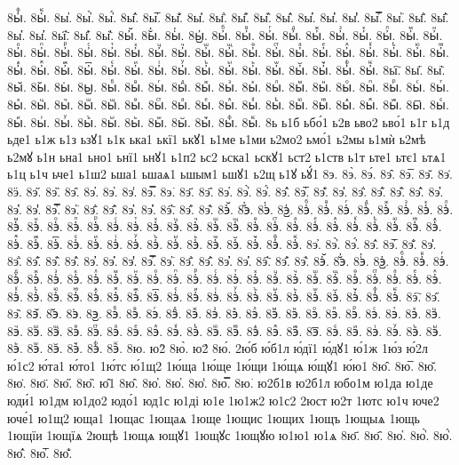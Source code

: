 {8ы҅ꚞ.
8ы҅ꚟ.
8ы҆.
8ы҆̀.
8ы҆́.
8ы҆̂.
8ы҆̅.
8ы҆̆.
8ы҆̇.
8ы҆̈.
8ы҆̋.
8ы҆̏.
8ы҆̑.
8ы҆̓.
8ы҆̔.
8ы҆̾.
8ы҆̿.
8ы҆͘.
8ы҆҃.
8ы҆҄.
8ы҆҅.
8ы҆҆.
8ы҆҇.
8ы҆᷀.
8ы҆᷁.
8ы҆᷶.
8ы᷷҆.
8ы᷸҆.
8ы᷹҆.
8ы҆ⷠ.
8ы҆ⷡ.
8ы҆ⷢ.
8ы҆ⷣ.
8ы҆ⷤ.
8ы҆ⷥ.
8ы҆ⷦ.
8ы҆ⷧ.
8ы҆ⷨ.
8ы҆ⷩ.
8ы҆ⷪ.
8ы҆ⷫ.
8ы҆ⷬ.
8ы҆ⷭ.
8ы҆ⷮ.
8ы҆ⷯ.
8ы҆ⷰ.
8ы҆ⷱ.
8ы҆ⷲ.
8ы҆ⷳ.
8ы҆ⷴ.
8ы҆ⷵ.
8ы҆ⷶ.
8ы҆ⷷ.
8ы҆ⷸ.
8ы҆ⷹ.
8ы҆ⷺ.
8ы҆ⷻ.
8ы҆ⷼ.
8ы҆ⷽ.
8ы҆ⷾ.
8ы҆ⷿ.
8ы҆꙯.
8ы҆ꙴ.
8ы҆ꙵ.
8ы҆ꙶ.
8ы҆ꙷ.
8ы҆ꙸ.
8ы҆ꙹ.
8ы҆ꙺ.
8ы҆ꙻ.
8ы҆꙼.
8ы҆꙽.
8ы҆ꚞ.
8ы҆ꚟ.
8ы҇.
8ы᷀.
8ы᷁.
8ы᷶.
8ы᷷.
8ы᷸.
8ы᷹.
8ыⷠ.
8ыⷡ.
8ыⷢ.
8ыⷣ.
8ыⷤ.
8ыⷥ.
8ыⷦ.
8ыⷧ.
8ыⷨ.
8ыⷩ.
8ыⷪ.
8ыⷫ.
8ыⷬ.
8ыⷭ.
8ыⷮ.
8ыⷯ.
8ыⷰ.
8ыⷱ.
8ыⷲ.
8ыⷳ.
8ыⷴ.
8ыⷵ.
8ыⷶ.
8ыⷷ.
8ыⷸ.
8ыⷹ.
8ыⷺ.
8ыⷻ.
8ыⷼ.
8ыⷽ.
8ыⷾ.
8ыⷿ.
8ы꙯.
8ыꙴ.
8ыꙵ.
8ыꙶ.
8ыꙷ.
8ыꙸ.
8ыꙹ.
8ыꙺ.
8ыꙻ.
8ы꙼.
8ы꙽.
8ыꚞ.
8ыꚟ.
8ь
ь1б
ьбо́1
ь2в
ьво2
ьво́1
ь1г
ь1д
ьде1
ь1ж
ь1з
ьзꙋ1
ь1к
ька1
ькї1
ькꙋ1
ь1ме
ь1ми
ь2мо2
ьмо́1
ь2мы
ь1мѝ
ь2мѣ
ь2мꙋ
ь1н
ьна1
ьно1
ьнї1
ьнꙋ1
ь1п2
ьс2
ьска1
ьскꙋ1
ьст2
ь1ств
ь1т
ьте1
ьтє1
ьтѧ1
ь1ц
ь1ч
ьче1
ь1ш2
ьша1
ьшаѧ1
ьшым1
ьшꙋ1
ь2щ
ь1ꙋ
ьꙋ́1
8э.
8э̀.
8э́.
8э̂.
8э̅.
8э̆.
8э̇.
8ӭ.
8э̋.
8э̏.
8э̑.
8э̓.
8э̔.
8э̾.
8э̿.
8э͘.
8э҃.
8э҄.
8э҅.
8э҅̀.
8э҅́.
8э҅̂.
8э҅̅.
8э҅̆.
8э҅̇.
8э҅̈.
8э҅̋.
8э҅̏.
8э҅̑.
8э҅̓.
8э҅̔.
8э҅̾.
8э҅̿.
8э҅͘.
8э҅҃.
8э҅҄.
8э҅҅.
8э҅҆.
8э҅҇.
8э҅᷀.
8э҅᷁.
8э҅᷶.
8э᷷҅.
8э᷸҅.
8э᷹҅.
8э҅ⷠ.
8э҅ⷡ.
8э҅ⷢ.
8э҅ⷣ.
8э҅ⷤ.
8э҅ⷥ.
8э҅ⷦ.
8э҅ⷧ.
8э҅ⷨ.
8э҅ⷩ.
8э҅ⷪ.
8э҅ⷫ.
8э҅ⷬ.
8э҅ⷭ.
8э҅ⷮ.
8э҅ⷯ.
8э҅ⷰ.
8э҅ⷱ.
8э҅ⷲ.
8э҅ⷳ.
8э҅ⷴ.
8э҅ⷵ.
8э҅ⷶ.
8э҅ⷷ.
8э҅ⷸ.
8э҅ⷹ.
8э҅ⷺ.
8э҅ⷻ.
8э҅ⷼ.
8э҅ⷽ.
8э҅ⷾ.
8э҅ⷿ.
8э҅꙯.
8э҅ꙴ.
8э҅ꙵ.
8э҅ꙶ.
8э҅ꙷ.
8э҅ꙸ.
8э҅ꙹ.
8э҅ꙺ.
8э҅ꙻ.
8э҅꙼.
8э҅꙽.
8э҅ꚞ.
8э҅ꚟ.
8э҆.
8э҆̀.
8э҆́.
8э҆̂.
8э҆̅.
8э҆̆.
8э҆̇.
8э҆̈.
8э҆̋.
8э҆̏.
8э҆̑.
8э҆̓.
8э҆̔.
8э҆̾.
8э҆̿.
8э҆͘.
8э҆҃.
8э҆҄.
8э҆҅.
8э҆҆.
8э҆҇.
8э҆᷀.
8э҆᷁.
8э҆᷶.
8э᷷҆.
8э᷸҆.
8э᷹҆.
8э҆ⷠ.
8э҆ⷡ.
8э҆ⷢ.
8э҆ⷣ.
8э҆ⷤ.
8э҆ⷥ.
8э҆ⷦ.
8э҆ⷧ.
8э҆ⷨ.
8э҆ⷩ.
8э҆ⷪ.
8э҆ⷫ.
8э҆ⷬ.
8э҆ⷭ.
8э҆ⷮ.
8э҆ⷯ.
8э҆ⷰ.
8э҆ⷱ.
8э҆ⷲ.
8э҆ⷳ.
8э҆ⷴ.
8э҆ⷵ.
8э҆ⷶ.
8э҆ⷷ.
8э҆ⷸ.
8э҆ⷹ.
8э҆ⷺ.
8э҆ⷻ.
8э҆ⷼ.
8э҆ⷽ.
8э҆ⷾ.
8э҆ⷿ.
8э҆꙯.
8э҆ꙴ.
8э҆ꙵ.
8э҆ꙶ.
8э҆ꙷ.
8э҆ꙸ.
8э҆ꙹ.
8э҆ꙺ.
8э҆ꙻ.
8э҆꙼.
8э҆꙽.
8э҆ꚞ.
8э҆ꚟ.
8э҇.
8э᷀.
8э᷁.
8э᷶.
8э᷷.
8э᷸.
8э᷹.
8эⷠ.
8эⷡ.
8эⷢ.
8эⷣ.
8эⷤ.
8эⷥ.
8эⷦ.
8эⷧ.
8эⷨ.
8эⷩ.
8эⷪ.
8эⷫ.
8эⷬ.
8эⷭ.
8эⷮ.
8эⷯ.
8эⷰ.
8эⷱ.
8эⷲ.
8эⷳ.
8эⷴ.
8эⷵ.
8эⷶ.
8эⷷ.
8эⷸ.
8эⷹ.
8эⷺ.
8эⷻ.
8эⷼ.
8эⷽ.
8эⷾ.
8эⷿ.
8э꙯.
8эꙴ.
8эꙵ.
8эꙶ.
8эꙷ.
8эꙸ.
8эꙹ.
8эꙺ.
8эꙻ.
8э꙼.
8э꙽.
8эꚞ.
8эꚟ.
8ю.
ю2̀
8ю̀.
ю2́
8ю́.
2ю́б
ю́б1л
ю́дї1
ю́дꙋ1
ю́1ж
1ю́з
ю́2л
ю́1с2
ю́та1
ю́то1
1ю́тс
ю́1щ2
1ю́ща
1ю́ще
1ю́щи
1ю́щѧ
ю́щꙋ1
ю́ю1
8ю̂.
8ю̅.
8ю̆.
8ю̇.
8ю̈.
8ю̋.
8ю̏.
ю̑1
8ю̑.
8ю̓.
8ю̔.
8ю̾.
8ю̿.
8ю͘.
ю2б1в
ю2б1л
юбо1м
ю1да
ю1де
юди́1
ю1дм
ю1до2
юдо́1
юд1с
ю1ді
ю1е
1ю1ж2
ю1с2
2юст
ю2т
1ютс
ю1ч
юче2
юче́1
ю1щ2
юща1
1ющас
1ющаѧ
1юще
1ющис
1ющих
1ющъ
1ющыѧ
1ющь
1ющїи
1ющїѧ
2ющѣ
1ющѧ
ющꙋ1
1ющꙋс
1ющꙋю
ю1ю1
ю1ѧ
8ю҃.
8ю҄.
8ю҅.
8ю҅̀.
8ю҅́.
8ю҅̂.
8ю҅̅.
8ю҅̆.
}

